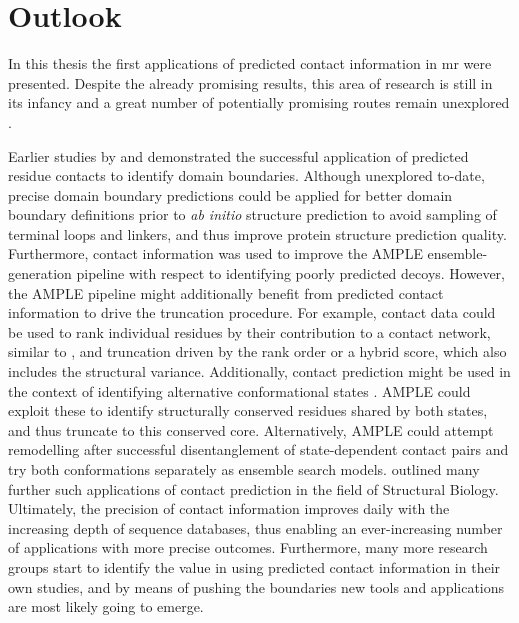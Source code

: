 \section{Outlook}
In this thesis the first applications of predicted contact information in \gls{mr} were presented. Despite the already promising results, this area of research is still in its infancy and a great number of potentially promising routes remain unexplored \cite{Simkovic2017-xs}. 

Earlier studies by \textcite{Rigden2002-mf} and \textcite{Sadowski2013-zu} demonstrated the successful application of predicted residue contacts to identify domain boundaries. Although unexplored to-date, precise domain boundary predictions could be applied for better domain boundary definitions prior to \textit{ab initio} structure prediction to avoid sampling of terminal loops and linkers, and thus improve protein structure prediction quality. Furthermore, contact information was used to improve the AMPLE ensemble-generation pipeline with respect to identifying poorly predicted decoys. However, the AMPLE pipeline might additionally benefit from predicted contact information to drive the truncation procedure. For example, contact data could be used to rank individual residues by their contribution to a contact network, similar to \textcite{Parente2015-mv}, and truncation driven by the rank order or a hybrid score, which also includes the structural variance. Additionally, contact prediction might be used in the context of identifying alternative conformational states \cite{Hopf2012-zl,Jana2014-rw,Sfriso2016-ml,Morcos2013-ks, Sutto2015-ck}. AMPLE could exploit these to identify structurally conserved residues shared by both states, and thus truncate to this conserved core. Alternatively, AMPLE could attempt remodelling after successful disentanglement of state-dependent contact pairs and try both conformations separately as ensemble search models. \textcite{Simkovic2017-xs} outlined many further such applications of contact prediction in the field of Structural Biology. Ultimately, the precision of contact information improves daily with the increasing depth of sequence databases, thus enabling an ever-increasing number of applications with more precise outcomes. Furthermore, many more research groups start to identify the value in using predicted contact information in their own studies, and by means of pushing the boundaries new tools and applications are most likely going to emerge. 

